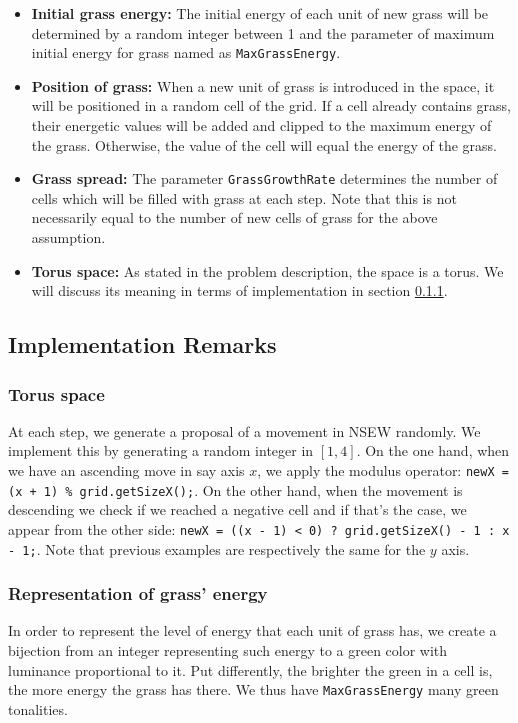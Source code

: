 \documentclass[11pt]{article}
\begin{document}
\begin{itemize}
    \item \textbf{Initial grass energy: }The initial energy of each unit of new grass will be determined by a random integer between 1 and the parameter of maximum initial energy for grass named as \texttt{MaxGrassEnergy}.
    
    \item \textbf{Position of grass: }When a new unit of grass is introduced in the space, it will be positioned in a random cell of the grid. If a cell already contains grass, their energetic values will be added and clipped to the maximum energy of the grass. Otherwise, the value of the cell will equal the energy of the grass.
    
    \item \textbf{Grass spread: }The parameter \texttt{GrassGrowthRate} determines the number of cells which will be filled with grass at each step. Note that this is not necessarily equal to the number of new cells of grass for the above assumption.
    
    \item \textbf{Torus space: }As stated in the problem description, the space is a torus. We will discuss its meaning in terms of implementation in section \ref{sec:imp-remarks}.
\end{itemize}{}


\subsection{Implementation Remarks}

\subsubsection{Torus space}
\label{sec:imp-remarks}
At each step, we generate a proposal of a movement in NSEW randomly. We implement this by generating a random integer in $[1,4]$. On the one hand, when we have an ascending move in say axis $x$, we apply the modulus operator: \texttt{newX = (x + 1) \% grid.getSizeX();}. On the other hand, when the movement is descending we check if we reached a negative cell and if that's the case, we appear from the other side: \texttt{newX = ((x - 1) < 0) ? grid.getSizeX() - 1 : x - 1;}. Note that previous examples are respectively the same for the $y$ axis.

\subsubsection{Representation of grass' energy}
In order to represent the level of energy that each unit of grass has, we create a bijection from an integer representing such energy to a green color with luminance proportional to it. Put differently, the brighter the green in a cell is, the more energy the grass has there. We thus have \texttt{MaxGrassEnergy} many green tonalities.
\end{document}
